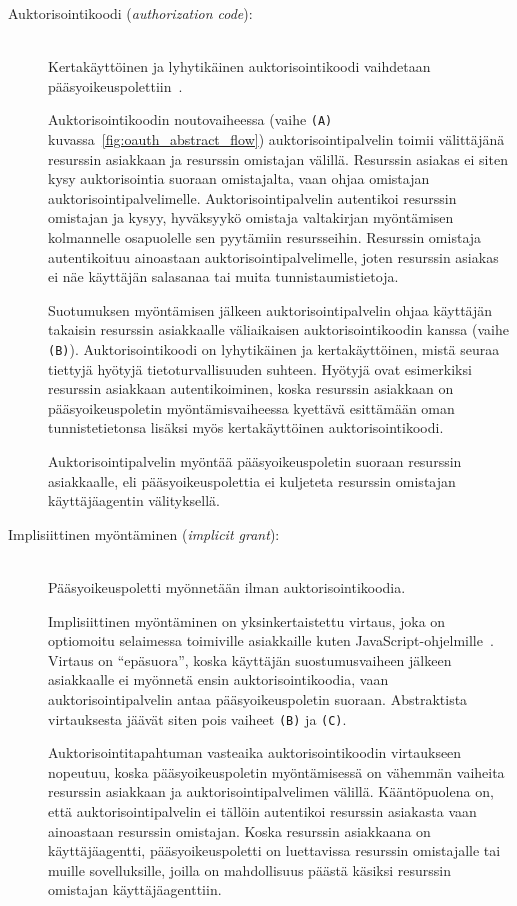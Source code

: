 \documentclass[finnish,gradu]{tktltiki}
\begin{document}
  \begin{description}
  \item[Auktorisointikoodi (\emph{authorization code}):] \hfill \\
  Kertakäyttöinen ja lyhytikäinen auktorisointikoodi vaihdetaan pääsyoikeuspolettiin~\cite{ietf_oauth2}.

  Auktorisointikoodin noutovaiheessa (vaihe \verb!(A)! kuvassa~\ref{fig:oauth_abstract_flow}) auktorisointipalvelin toimii välittäjänä resurssin asiakkaan ja resurssin omistajan välillä. Resurssin asiakas ei siten kysy auktorisointia suoraan omistajalta, vaan ohjaa omistajan auktorisointipalvelimelle. Auktorisointipalvelin autentikoi resurssin omistajan ja kysyy, hyväksyykö omistaja valtakirjan myöntämisen kolmannelle osapuolelle sen pyytämiin resursseihin. Resurssin omistaja autentikoituu ainoastaan auktorisointipalvelimelle, joten resurssin asiakas ei näe käyttäjän salasanaa tai muita tunnistaumistietoja.

  Suotumuksen myöntämisen jälkeen auktorisointipalvelin ohjaa käyttäjän takaisin resurssin asiakkaalle väliaikaisen auktorisointikoodin kanssa (vaihe \verb!(B)!). Auktorisointikoodi on lyhytikäinen ja kertakäyttöinen, mistä seuraa tiettyjä hyötyjä tietoturvallisuuden suhteen. Hyötyjä ovat esimerkiksi resurssin asiakkaan autentikoiminen, koska resurssin asiakkaan on pääsyoikeuspoletin myöntämisvaiheessa kyettävä esittämään oman tunnistetietonsa lisäksi myös kertakäyttöinen auktorisointikoodi.

  Auktorisointipalvelin myöntää pääsyoikeuspoletin suoraan resurssin asiakkaalle, eli pääsyoikeuspolettia ei kuljeteta resurssin omistajan käyttäjäagentin välityksellä.

  \item[Implisiittinen myöntäminen (\emph{implicit grant}):] \hfill \\
  Pääsyoikeuspoletti myönnetään ilman auktorisointikoodia.

  Implisiittinen myöntäminen on yksinkertaistettu virtaus, joka on optiomoitu selaimessa toimiville asiakkaille kuten JavaScript-ohjelmille~\cite{ietf_oauth2}. Virtaus on ``epäsuora'', koska käyttäjän suostumusvaiheen jälkeen asiakkaalle ei myönnetä ensin auktorisointikoodia, vaan auktorisointipalvelin antaa pääsyoikeuspoletin suoraan. Abstraktista virtauksesta jäävät siten pois vaiheet \verb!(B)! ja \verb!(C)!.

  Auktorisointitapahtuman vasteaika auktorisointikoodin virtaukseen nopeutuu, koska pääsyoikeuspoletin myöntämisessä on vähemmän vaiheita resurssin asiakkaan ja auktorisointipalvelimen välillä.  Kääntöpuolena on, että auktorisointipalvelin ei tällöin autentikoi resurssin asiakasta vaan ainoastaan resurssin omistajan. Koska resurssin asiakkaana on käyttäjäagentti, pääsyoikeuspoletti on luettavissa resurssin omistajalle tai muille sovelluksille, joilla on mahdollisuus päästä käsiksi resurssin omistajan käyttäjäagenttiin.


\end{description}
\end{document}
